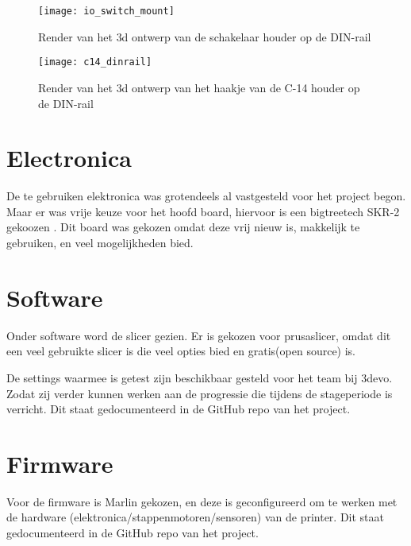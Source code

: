 \begin{figure}[h]
    \centering
    \begin{minipage}{0.45\textwidth}
        \centerline{\texttt{[image: io\_switch\_mount]}}
        \caption{Render van het \ac{3d} ontwerp van de schakelaar houder op de DIN-rail}
        \label{fig:din2}
    \end{minipage}\hfill
    \begin{minipage}{0.45\textwidth}
        \centerline{\texttt{[image: c14\_dinrail]}}
        \caption{Render van het \ac{3d} ontwerp van het haakje van de C-14 houder op de DIN-rail}
        \label{fig:din3}
    \end{minipage}
\end{figure}


\section{Electronica}

De te gebruiken elektronica was grotendeels al vastgesteld voor het project
begon. Maar er was vrije keuze voor het hoofd board, hiervoor is een
bigtreetech SKR-2 gekoozen \cite{btt}. Dit board was gekozen omdat deze vrij
nieuw is, makkelijk te gebruiken, en veel mogelijkheden bied.

\section{Software}

Onder software word de slicer gezien. Er is gekozen voor prusaslicer, omdat dit
een veel gebruikte slicer is die veel opties bied en gratis(open source) is.

De settings waarmee is getest zijn beschikbaar gesteld voor het team bij 3devo.
Zodat zij verder kunnen werken aan de progressie die tijdens de stageperiode is
verricht. Dit staat gedocumenteerd in de GitHub repo van het project.

\section{Firmware}

Voor de firmware is Marlin gekozen, en deze is geconfigureerd om te werken met
de hardware (elektronica/stappenmotoren/sensoren) van de printer. Dit staat
gedocumenteerd in de GitHub repo van het project.


